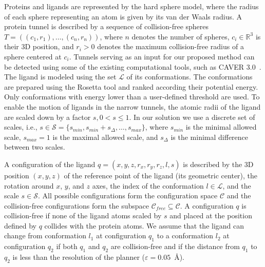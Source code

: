 \documentclass[usletter, 10pt, conference]{ieeeconf} %
\def\C{\mathcal{C}}
\def\CF{\mathcal{C}_{free}}
\def\R{\mathbb{R}}
\def\smin{s_{min}}
\def\smax{s_{max}}
\def\sdelta{s_{\Delta}}
\def\L{\mathcal{L}}
\def\S{\mathcal{S}}
\begin{document}
{Proteins and ligands are represented by the hard sphere model, where the radius of each sphere representing an atom is given by its van der Waals radius.
A protein tunnel is described by a sequence of collision-free spheres 
$T=( (c_1, r_1),\ldots,(c_n,r_n) )$, where $n$ denotes the number of spheres,
$c_i \in \R^3$ is their 3D position, and $r_i > 0$ denotes the maximum collision-free radius of a sphere centered at $c_i$. 
Tunnels serving as an input for our proposed method can be detected using some of the existing computational tools, such as CAVER 3.0~\cite{caver3}.
The ligand is modeled using the set $\L$ of its conformations.
The conformations are prepared using the Rosetta tool and ranked according their potential energy. Only conformations
with energy lower than a user-defined threshold are used.
To enable the motion of ligands in the narrow tunnels, the atomic radii of the ligand are scaled down by a factor $s, 0 < s \le 1$.
In our solution we use a discrete set of scales, i.e., $s \in \S=\{\smin, \smin+\sdelta, \ldots, \smax\}$, where 
$\smin$ is the minimal allowed scale, $\smax=1$ is the maximal allowed scale, and $\sdelta$ is the minimal difference between two scales.

A configuration of the ligand $q=(x,y,z,r_x,r_y,r_z,l,s)$ is described
by the 3D position $(x,y,z)$ of the reference point of the ligand (its geometric center), the rotation around $x$, $y$, and $z$ axes,
the index of the conformation $l\in \L$, and the scale $s \in \S$.
All possible configurations form the configuration space $\C$ and the collision-free configurations
form the subspace $\CF \subseteq \C$.
A configuration $q$ is collision-free if none of the ligand atoms scaled by $s$ and placed at the
position defined by $q$ collides with the protein atoms.
We assume that the ligand can change from conformation $l_1$ at configuration $q_1$ to a conformation $l_2$ at configuration $q_2$
if both $q_1$ and $q_2$ are collision-free and if the distance from $q_1$ to $q_2$ is less than the resolution of the planner ($\varepsilon=0.05$~\AA).


}
\end{document}
